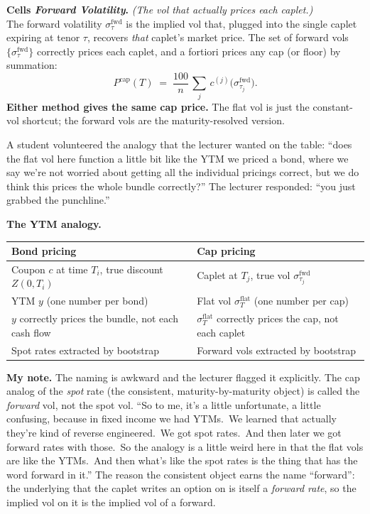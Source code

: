 \begin{keyblock}
\textbf{Cells \emph{Forward Volatility}.}
\emph{(The vol that actually prices each caplet.)}\\
The forward volatility $\sigma^{\text{fwd}}_{\tau}$ is the implied vol
that, plugged into the single caplet expiring at tenor $\tau$,
recovers \emph{that} caplet's market price. The set of forward vols
$\{\sigma^{\text{fwd}}_{\tau}\}$ correctly prices each caplet, and a
fortiori prices any cap (or floor) by summation:
\[
  P^{\text{cap}}(T) \;=\; \frac{100}{n}\,\sum_{j} \,
       c^{(j)}\bigl(\sigma^{\text{fwd}}_{\tau_j}\bigr).
\]
\textbf{Either method gives the same cap price.} The flat vol is just
the constant-vol shortcut; the forward vols are the maturity-resolved
version.
\end{keyblock}

A student volunteered the analogy that the lecturer wanted on the
table: ``does the flat vol here function a little bit like the YTM
we priced a bond, where we say we're not worried about getting all
the individual pricings correct, but we do think this prices the
whole bundle correctly?'' The lecturer responded: ``you just grabbed
the punchline.''

\begin{keyblock}
\textbf{The YTM analogy.}
\begin{center}
\begin{tabular}{ll}
\textbf{Bond pricing} & \textbf{Cap pricing} \\
\hline
Coupon $c$ at time $T_i$, true discount $Z(0, T_i)$ & Caplet at $T_j$, true vol $\sigma^{\text{fwd}}_{\tau_j}$ \\
YTM $y$ (one number per bond) & Flat vol $\sigma^{\text{flat}}_T$ (one number per cap) \\
$y$ correctly prices the bundle, not each cash flow & $\sigma^{\text{flat}}_T$ correctly prices the cap, not each caplet \\
Spot rates extracted by bootstrap & Forward vols extracted by bootstrap \\
\end{tabular}
\end{center}
\end{keyblock}

\begin{checkpoint}
\textbf{My note.} The naming is awkward and the lecturer flagged it
explicitly. The cap analog of the \emph{spot} rate (the consistent,
maturity-by-maturity object) is called the \emph{forward} vol, not
the spot vol. ``So to me, it's a little unfortunate, a little
confusing, because in fixed income we had YTMs.\ We learned that
actually they're kind of reverse engineered.\ We got spot rates.\
And then later we got forward rates with those.\ So the analogy is a
little weird here in that the flat vols are like the YTMs.\ And then
what's like the spot rates is the thing that has the word forward in
it.'' The reason the consistent object earns the name ``forward'':
the underlying that the caplet writes an option on is itself a
\emph{forward rate}, so the implied vol on it is the implied vol of a
forward.
\end{checkpoint}

